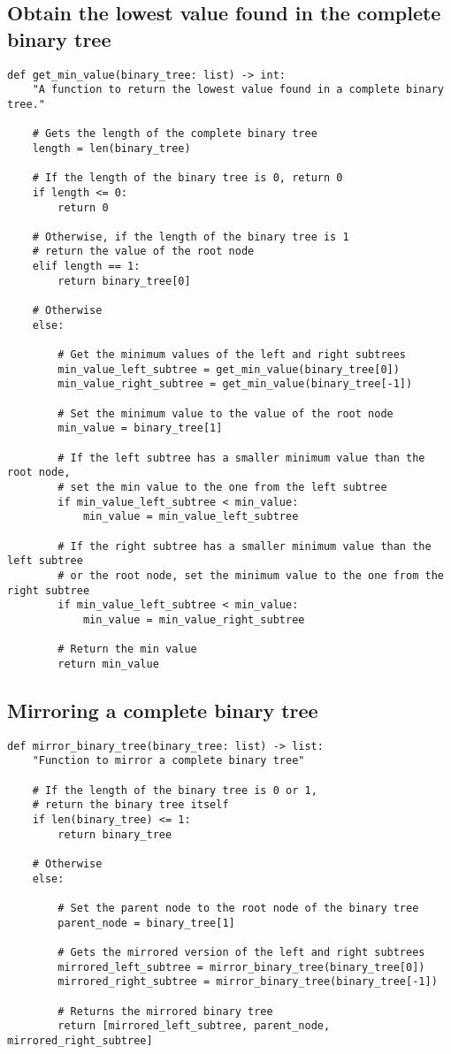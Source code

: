 \documentclass[11pt]{article}
\begin{document}
\subsection{Obtain the lowest value found in the complete binary tree}
\label{sec:org684b059}
\begin{verbatim}
def get_min_value(binary_tree: list) -> int:
    "A function to return the lowest value found in a complete binary tree."

    # Gets the length of the complete binary tree
    length = len(binary_tree)

    # If the length of the binary tree is 0, return 0
    if length <= 0:
        return 0

    # Otherwise, if the length of the binary tree is 1
    # return the value of the root node
    elif length == 1:
        return binary_tree[0]

    # Otherwise
    else:

        # Get the minimum values of the left and right subtrees
        min_value_left_subtree = get_min_value(binary_tree[0])
        min_value_right_subtree = get_min_value(binary_tree[-1])

        # Set the minimum value to the value of the root node
        min_value = binary_tree[1]

        # If the left subtree has a smaller minimum value than the root node,
        # set the min value to the one from the left subtree
        if min_value_left_subtree < min_value:
            min_value = min_value_left_subtree

        # If the right subtree has a smaller minimum value than the left subtree
        # or the root node, set the minimum value to the one from the right subtree
        if min_value_left_subtree < min_value:
            min_value = min_value_right_subtree

        # Return the min value
        return min_value
\end{verbatim}
\subsection{Mirroring a complete binary tree}
\label{sec:org3f6c37f}
\begin{verbatim}
def mirror_binary_tree(binary_tree: list) -> list:
    "Function to mirror a complete binary tree"

    # If the length of the binary tree is 0 or 1,
    # return the binary tree itself
    if len(binary_tree) <= 1:
        return binary_tree

    # Otherwise
    else:

        # Set the parent node to the root node of the binary tree
        parent_node = binary_tree[1]

        # Gets the mirrored version of the left and right subtrees
        mirrored_left_subtree = mirror_binary_tree(binary_tree[0])
        mirrored_right_subtree = mirror_binary_tree(binary_tree[-1])

        # Returns the mirrored binary tree
        return [mirrored_left_subtree, parent_node, mirrored_right_subtree]
\end{verbatim}
\end{document}
